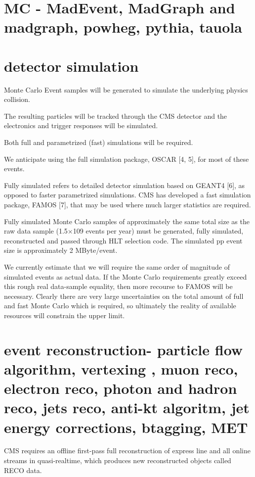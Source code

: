 \section{ MC - MadEvent, MadGraph and madgraph\@NLO, powheg, pythia, tauola}
\section{ detector simulation}

Monte Carlo Event samples will be generated to simulate the underlying physics collision.

The resulting particles will be tracked through the CMS detector and the electronics and trigger
responses will be simulated.

Both full and parametrized (fast) simulations will be required.

We anticipate using the full simulation package, OSCAR [4, 5], for most of these events.

Fully
simulated refers to detailed detector simulation based on GEANT4 [6], as opposed to faster
parametrized simulations. CMS has developed a fast simulation package, FAMOS [7], that may
be used where much larger statistics are required.

Fully simulated Monte Carlo samples of approximately the same total size as the raw data sample (1.5×109 events per year) must be generated, fully simulated, reconstructed and passed through HLT selection code. The simulated pp event size is approximately 2 MByte/event.


We currently estimate that we will require the same order of magnitude of simulated events as actual data. If the Monte Carlo requirements greatly exceed this rough real data-sample equality, then more recourse to FAMOS will be necessary. Clearly there are very large uncertainties on the total amount of full and fast Monte Carlo which is required, so ultimately the reality of available resources will constrain the upper limit.




\section{event reconstruction- particle flow algorithm, vertexing , muon reco, electron reco, photon and hadron reco, jets reco, anti-kt algoritm, jet energy corrections, btagging, MET  }


CMS requires an offline first-pass full reconstruction of express line and all
online streams in quasi-realtime, which produces new reconstructed objects
called RECO data.


